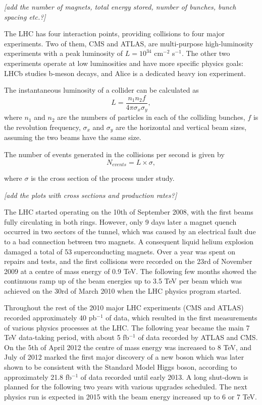 \textit{[add the number of magnets, total energy stored, number of bunches, bunch spacing etc.?]}

The LHC has four interaction points, providing collisions to four major experiments. Two of them, CMS and ATLAS, are
multi-purpose high-luminosity experiments with a peak luminosity of $L = 10^{34}$ cm$^{-2}$ s$^{-1}$. The other two
experiments operate at low luminosities and have more specific physics goals: LHCb studies b-meson decays, and Alice is
a dedicated heavy ion experiment.

The instantaneous luminosity of a collider can be calculated as
\begin{equation}
	L = \frac{n_1 n_2 f}{4 \pi \sigma_x \sigma_y},
\end{equation}
where $n_1$ and $n_2$ are the numbers of particles in each of the colliding bunches, $f$ is the revolution frequency,
$\sigma_x$ and $\sigma_y$ are the horizontal and vertical beam sizes, assuming the two beams have the same size.

The number of events generated in the collisions per second is given by
\begin{equation}
	N_{events} = L \times \sigma,
\end{equation}

where $\sigma$ is the cross section of the process under study.

\textit{[add the plots with cross sections and production rates?]}

The LHC started operating on the 10th of September 2008, with the first beams fully circulating in both rings. However,
only 9 days later a magnet quench occurred in two sectors of the tunnel, which was caused by an electrical fault due to
a bad connection between two magnets. A consequent liquid helium explosion damaged a total of 53 superconducting
magnets. Over a year was spent on repairs and tests, and the first collisions were recorded on the 23rd of November 2009
at a centre of mass energy of 0.9 TeV. The following few months showed the continuous ramp up of the beam energies up to
3.5 TeV per beam which was achieved on the 30rd of March 2010 when the LHC physics program started.

Throughout the rest of the 2010 major LHC experiments (CMS and ATLAS) recorded approximately 40 pb$^{-1}$ of data,
which resulted in the first measurements of various physics processes at the LHC. The following year became the main 7
TeV data-taking period, with about 5 fb$^{-1}$ of data recorded by ATLAS and CMS. On the 5th of April 2012 the centre
of mass energy was increased to 8 TeV, and July of 2012 marked the first major discovery of a new boson which
was later shown to be consistent with the Standard Model Higgs boson, according to approximately 21.8
fb$^{-1}$ of data recorded until early 2013. A long shut-down is planned for the following two years with various
upgrades scheduled. The next physics run is expected in 2015 with the beam energy increased up to 6 or 7 TeV. 

